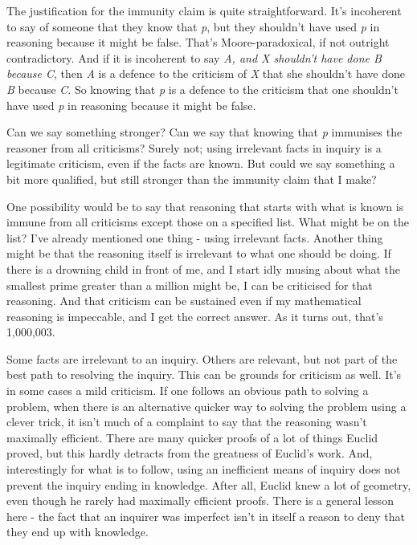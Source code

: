 \documentclass[
  11pt,
]{book}
\begin{document}
The justification for the immunity claim is quite straightforward. It's incoherent to say of someone that they know that \emph{p}, but they shouldn't have used \emph{p} in reasoning because it might be false. That's Moore-paradoxical, if not outright contradictory. And if it is incoherent to say \emph{A, and X shouldn't have done B because C}, then \emph{A} is a defence to the criticism of \emph{X} that she shouldn't have done \emph{B} because \emph{C}. So knowing that \emph{p} is a defence to the criticism that one shouldn't have used \emph{p} in reasoning because it might be false.

Can we say something stronger? Can we say that knowing that \emph{p} immunises the reasoner from all criticisms? Surely not; using irrelevant facts in inquiry is a legitimate criticism, even if the facts are known. But could we say something a bit more qualified, but still stronger than the immunity claim that I make?

One possibility would be to say that reasoning that starts with what is known is immune from all criticisms except those on a specified list. What might be on the list? I've already mentioned one thing - using irrelevant facts. Another thing might be that the reasoning itself is irrelevant to what one should be doing. If there is a drowning child in front of me, and I start idly musing about what the smallest prime greater than a million might be, I can be criticised for that reasoning. And that criticism can be sustained even if my mathematical reasoning is impeccable, and I get the correct answer. As it turns out, that's 1,000,003.

Some facts are irrelevant to an inquiry. Others are relevant, but not part of the best path to resolving the inquiry. This can be grounds for criticism as well. It's in some cases a mild criticism. If one follows an obvious path to solving a problem, when there is an alternative quicker way to solving the problem using a clever trick, it isn't much of a complaint to say that the reasoning wasn't maximally efficient. There are many quicker proofs of a lot of things Euclid proved, but this hardly detracts from the greatness of Euclid's work. And, interestingly for what is to follow, using an inefficient means of inquiry does not prevent the inquiry ending in knowledge. After all, Euclid knew a lot of geometry, even though he rarely had maximally efficient proofs. There is a general lesson here - the fact that an inquirer was imperfect isn't in itself a reason to deny that they end up with knowledge.
\end{document}
